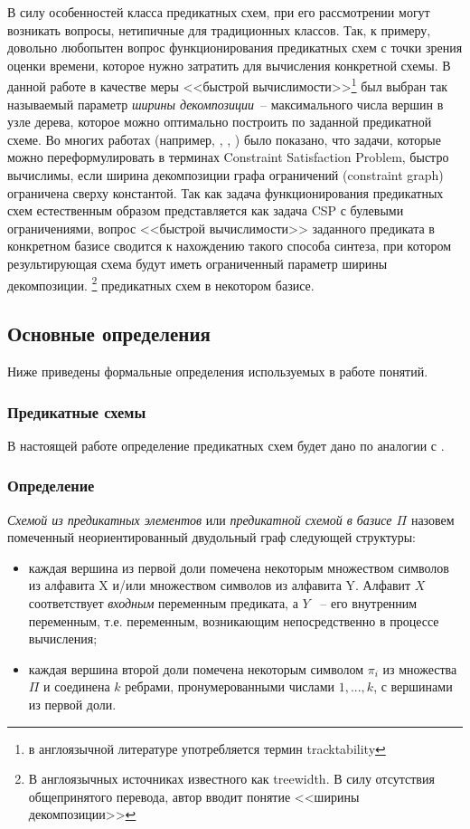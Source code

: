 \documentclass[12pt]{article}
\begin{document}
В силу особенностей класса предикатных схем, при его рассмотрении могут возникать вопросы,
нетипичные для традиционных классов. Так, к примеру, довольно любопытен вопрос функционирования предикатных схем с точки зрения оценки времени, которое нужно затратить для
вычисления конкретной схемы. 
В данной работе в качестве меры <<быстрой вычислимости>>\footnote{в англоязычной литературе употребляется термин tracktability}
 был выбран так называемый параметр \textit{ширины декомпозиции}~-- максимального числа вершин в узле дерева, 
которое можно оптимально построить по заданной предикатной схеме. Во многих работах (например, \cite{CSP10}, \cite{Gott10}, \cite{Prosc89}) было 
показано, что задачи, которые можно переформулировать в терминах Constraint Satisfaction Problem, быстро вычислимы, если ширина декомпозиции графа ограничений 
(constraint graph) ограничена сверху константой. Так как задача функционирования предикатных схем естественным образом представляется как задача CSP с булевыми ограничениями,
 вопрос <<быстрой вычислимости>> заданного предиката в конкретном базисе сводится к нахождению такого способа синтеза, при котором результирующая схема будут 
иметь ограниченный параметр ширины декомпозиции.
\footnote
{В англоязычных источниках известного как treewidth. В силу отсутствия общепринятого перевода, автор вводит 
понятие <<ширины декомпозиции>>} предикатных схем в некотором базисе.

\subsection{Основные определения}
Ниже приведены формальные определения используемых в работе понятий.

\subsubsection{Предикатные схемы}

В настоящей работе определение предикатных схем будет дано по аналогии с \cite{Shu11}.

\subsubsection*{Определение}

\textit{Схемой из предикатных элементов} или \textit{предикатной схемой в базисе $\Pi$} назовем помеченный
неориентированный двудольный граф следующей структуры:

\begin{itemize}
\item каждая вершина из первой доли помечена некоторым множеством символов из алфавита X и/или 
множеством символов из алфавита Y. Алфавит $X$ соответствует \textit{входным} переменным предиката, а $Y$ ~-- его внутренним переменным, 
т.е. переменным, возникающим непосредственно в процессе вычисления; 

\item каждая вершина второй доли помечена некоторым символом $\pi_i$ из множества $\Pi$ и 
соединена $k$ ребрами, пронумерованными числами $1, ..., k$, с вершинами из первой доли.
\end{itemize}
\end{document}
